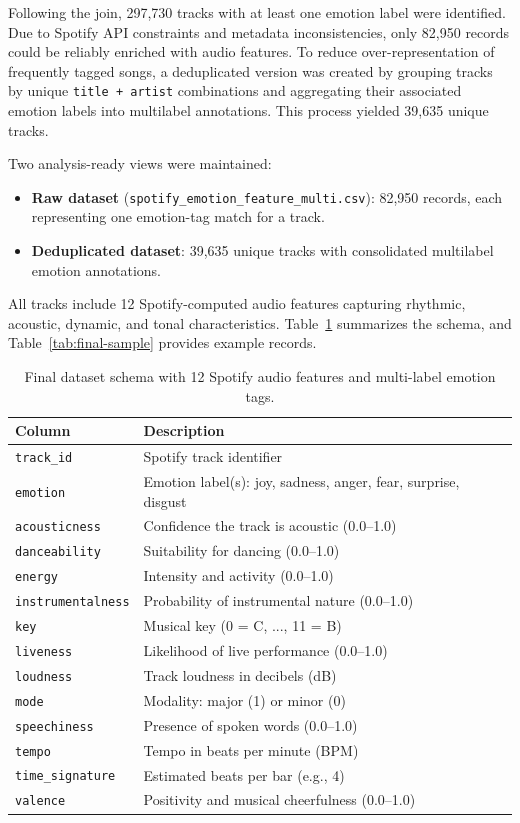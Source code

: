 \documentclass{article}
\begin{document}
Following the join, 297,730 tracks with at least one emotion label were identified. Due to Spotify API constraints and metadata inconsistencies, only 82,950 records could be reliably enriched with audio features. To reduce over-representation of frequently tagged songs, a deduplicated version was created by grouping tracks by unique \texttt{title + artist} combinations and aggregating their associated emotion labels into multilabel annotations. This process yielded 39,635 unique tracks.

Two analysis-ready views were maintained:

\begin{itemize}
    \item \textbf{Raw dataset} (\texttt{spotify\_emotion\_feature\_multi.csv}): 82,950 records, each representing one emotion-tag match for a track.
    \item \textbf{Deduplicated dataset}: 39,635 unique tracks with consolidated multilabel emotion annotations.
\end{itemize}

All tracks include 12 Spotify-computed audio features capturing rhythmic, acoustic, dynamic, and tonal characteristics. Table~\ref{tab:final-dataset-schema} summarizes the schema, and Table~\ref{tab:final-sample} provides example records.

\begin{table}[H]
\centering
\begin{tabular}{|l|l|}
\hline
\textbf{Column} & \textbf{Description} \\
\hline
\texttt{track\_id} & Spotify track identifier \\
\texttt{emotion} & Emotion label(s): joy, sadness, anger, fear, surprise, disgust \\
\texttt{acousticness} & Confidence the track is acoustic (0.0–1.0) \\
\texttt{danceability} & Suitability for dancing (0.0–1.0) \\
\texttt{energy} & Intensity and activity (0.0–1.0) \\
\texttt{instrumentalness} & Probability of instrumental nature (0.0–1.0) \\
\texttt{key} & Musical key (0 = C, ..., 11 = B) \\
\texttt{liveness} & Likelihood of live performance (0.0–1.0) \\
\texttt{loudness} & Track loudness in decibels (dB) \\
\texttt{mode} & Modality: major (1) or minor (0) \\
\texttt{speechiness} & Presence of spoken words (0.0–1.0) \\
\texttt{tempo} & Tempo in beats per minute (BPM) \\
\texttt{time\_signature} & Estimated beats per bar (e.g., 4) \\
\texttt{valence} & Positivity and musical cheerfulness (0.0–1.0) \\
\hline
\end{tabular}
\caption{Final dataset schema with 12 Spotify audio features and multi-label emotion tags.}
\label{tab:final-dataset-schema}
\end{table}
\end{document}
